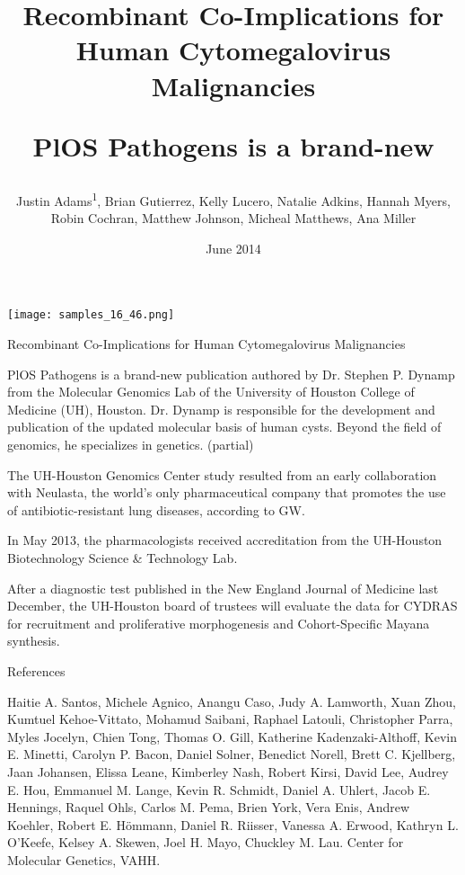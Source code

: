 \documentclass{article}
\title{Recombinant Co-Implications for Human Cytomegalovirus Malignancies

PlOS Pathogens is a brand-new}
\author{Justin Adams\textsuperscript{1},  Brian Gutierrez,  Kelly Lucero,  Natalie Adkins,  Hannah Myers,  Robin Cochran,  Matthew Johnson,  Micheal Matthews,  Ana Miller}
\affil{\textsuperscript{1}Osaka City University}
\date{June 2014}
\begin{document}
\maketitle

\begin{center}
\begin{minipage}{0.75\linewidth}
\texttt{[image: samples\_16\_46.png]}
\end{minipage}
\end{center}

Recombinant Co-Implications for Human Cytomegalovirus Malignancies

PlOS Pathogens is a brand-new publication authored by Dr. Stephen P. Dynamp from the Molecular Genomics Lab of the University of Houston College of Medicine (UH), Houston. Dr. Dynamp is responsible for the development and publication of the updated molecular basis of human cysts. Beyond the field of genomics, he specializes in genetics. (partial)

The UH-Houston Genomics Center study resulted from an early collaboration with Neulasta, the world’s only pharmaceutical company that promotes the use of antibiotic-resistant lung diseases, according to GW.

In May 2013, the pharmacologists received accreditation from the UH-Houston Biotechnology Science \& Technology Lab.

After a diagnostic test published in the New England Journal of Medicine last December, the UH-Houston board of trustees will evaluate the data for CYDRAS for recruitment and proliferative morphogenesis and Cohort-Specific Mayana synthesis.

References

Haitie A. Santos, Michele Agnico, Anangu Caso, Judy A. Lamworth, Xuan Zhou, Kumtuel Kehoe-Vittato, Mohamud Saibani, Raphael Latouli, Christopher Parra, Myles Jocelyn, Chien Tong, Thomas O. Gill, Katherine Kadenzaki-Althoff, Kevin E. Minetti, Carolyn P. Bacon, Daniel Solner, Benedict Norell, Brett C. Kjellberg, Jaan Johansen, Elissa Leane, Kimberley Nash, Robert Kirsi, David Lee, Audrey E. Hou, Emmanuel M. Lange, Kevin R. Schmidt, Daniel A. Uhlert, Jacob E. Hennings, Raquel Ohls, Carlos M. Pema, Brien York, Vera Enis, Andrew Koehler, Robert E. Hömmann, Daniel R. Riisser, Vanessa A. Erwood, Kathryn L. O’Keefe, Kelsey A. Skewen, Joel H. Mayo, Chuckley M. Lau. Center for Molecular Genetics, VAHH.
\end{document}
